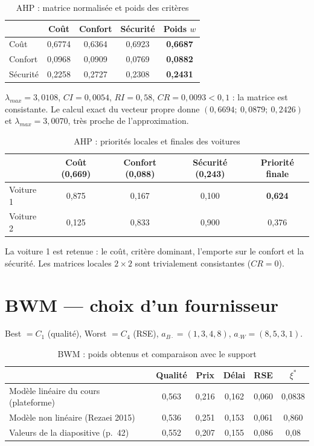 \documentclass[11pt,a4paper]{report}
\theoremstyle{definition}
\theoremstyle{remark}
\begin{document}
\begin{table}[H]
\centering
\caption{AHP : matrice normalisée et poids des critères}\label{tab:ahp}
\begin{tabular}{lcccc}
\toprule
 & Coût & Confort & Sécurité & \textbf{Poids $w$}\\
\midrule
Coût & 0,6774 & 0,6364 & 0,6923 & \textbf{0,6687}\\
Confort & 0,0968 & 0,0909 & 0,0769 & \textbf{0,0882}\\
Sécurité & 0,2258 & 0,2727 & 0,2308 & \textbf{0,2431}\\
\bottomrule
\end{tabular}
\end{table}

$\lambda_{max}=3{,}0108$, $CI=0{,}0054$, $RI=0{,}58$, $CR=0{,}0093<0{,}1$ : la matrice est consistante.
Le calcul exact du vecteur propre donne $(0{,}6694;\ 0{,}0879;\ 0{,}2426)$ et $\lambda_{max}=3{,}0070$,
très proche de l'approximation.

\begin{table}[H]
\centering
\caption{AHP : priorités locales et finales des voitures}\label{tab:ahp2}
\begin{tabular}{lcccc}
\toprule
 & Coût (0,669) & Confort (0,088) & Sécurité (0,243) & \textbf{Priorité finale}\\
\midrule
Voiture 1 & 0,875 & 0,167 & 0,100 & \textbf{0,624}\\
Voiture 2 & 0,125 & 0,833 & 0,900 & 0,376\\
\bottomrule
\end{tabular}
\end{table}

La voiture 1 est retenue : le coût, critère dominant, l'emporte sur le confort et la sécurité. Les matrices
locales $2\times 2$ sont trivialement consistantes ($CR=0$).

\section{BWM --- choix d'un fournisseur}

Best $=C_1$ (qualité), Worst $=C_4$ (RSE), $a_{B\cdot}=(1,3,4,8)$, $a_{\cdot W}=(8,5,3,1)$.

\begin{table}[H]
\centering
\caption{BWM : poids obtenus et comparaison avec le support}\label{tab:bwm}
\begin{tabular}{lccccc}
\toprule
 & Qualité & Prix & Délai & RSE & $\xi^*$\\
\midrule
Modèle linéaire du cours (plateforme) & 0,563 & 0,216 & 0,162 & 0,060 & 0,0838\\
Modèle non linéaire (Rezaei 2015) & 0,536 & 0,251 & 0,153 & 0,061 & 0,860\\
Valeurs de la diapositive (p.~42) & 0,552 & 0,207 & 0,155 & 0,086 & 0,08\\
\bottomrule
\end{tabular}
\end{table}
\end{document}
